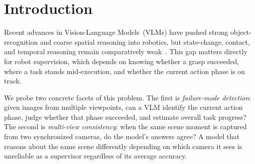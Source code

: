 \section{Introduction}
\label{sec:intro}


 

Recent advances in Vision-Language Models~(VLMs) have pushed strong object-recognition and coarse spatial reasoning into robotics, but state-change, contact, and temporal reasoning remain comparatively weak~\cite{lin2025vlmsurvey}. This gap matters directly for robot supervision, which depends on knowing whether a grasp succeeded, where a task stands mid-execution, and whether the current action phase is on track.

We probe two concrete facets of this problem. The first is \emph{failure-mode detection}: given images from multiple viewpoints, can a VLM identify the current action phase, judge whether that phase succeeded, and estimate overall task progress? The second is \emph{multi-view consistency}: when the same scene moment is captured from two synchronized cameras, do the model's answers agree? A model that reasons about the same scene differently depending on which camera it sees is unreliable as a supervisor regardless of its average accuracy.


